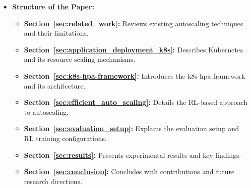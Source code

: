 \documentclass[conference]{IEEEtran}
\begin{document}
\begin{itemize}
    \item \textbf{Structure of the Paper:}
    \begin{itemize}
        \item \textbf{Section~\ref{sec:related_work}:} Reviews existing autoscaling techniques and their limitations.
        \item \textbf{Section~\ref{sec:application_deployment_k8s}:} Describes Kubernetes and its resource scaling mechanisms.
        \item \textbf{Section~\ref{sec:k8s-hpa-framework}:} Introduces the k8s-hpa framework and its architecture.
        \item \textbf{Section~\ref{sec:efficient_auto_scaling}:} Details the RL-based approach to autoscaling.
        \item \textbf{Section~\ref{sec:evaluation_setup}:} Explains the evaluation setup and RL training configurations.
        \item \textbf{Section~\ref{sec:results}:} Presents experimental results and key findings.
        \item \textbf{Section~\ref{sec:conclusion}:} Concludes with contributions and future research directions.
    \end{itemize}
\end{itemize}
\end{document}
